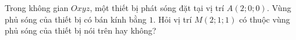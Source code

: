 \begin{bt}[KNTT]%
	Trong không gian $Oxyz$, một thiết bị phát sóng đặt tại vị trí $A(2 ; 0 ; 0)$. Vùng phủ sóng của thiết bị có bán kính bằng $1$. Hỏi vị trí $M(2 ; 1 ; 1)$ có thuộc vùng phủ sóng của thiết bị nói trên hay không?
\end{bt}

